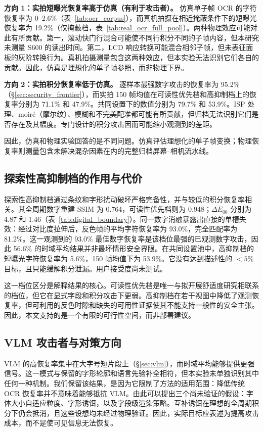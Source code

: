 \documentclass{ieeeaccess}
\begin{document}
\textbf{方向 1：实拍短曝光恢复率高于仿真（有利于攻击者）。} 仿真单子帧 OCR 的字符恢复率为 0--2.6\%（表~\ref{tab:ocr_corpus}），而真机拍摄在相近掩蔽条件下的短曝光恢复率为 19.2\%（仅掩蔽档，表~\ref{tab:real_ocr_full_pool}）。两种物理效应可能对此有所贡献。第一，滚动快门行混合可能使不同行积分不同的子帧内容，但本研究未测量 S600 的读出时间。第二，LCD 响应转换可能混合相邻子帧，但未表征面板的灰阶转换行为。真机拍摄测量包含这两种效应，但本实验无法识别它们各自的贡献。因此，仿真是理想化的单子帧参照，而非物理下界。

\textbf{方向 2：实拍积分恢复率低于仿真。} 逐样本最强数字攻击的恢复率为 95.2\%（\S\ref{sec:security_frontier}），而实拍 150 帧均值在可读性优先档和高抑制档上的恢复率分别为 71.1\% 和 47.9\%。共同设置下的数值分别为 79.7\% 和 53.9\%。ISP 处理、moir\'{e}（摩尔纹）、模糊和不完美配准都可能有所贡献，但归档无法识别它们是否存在及其幅度。专门设计的积分攻击因而可能缩小观测到的差距。

因此，仿真和物理实验回答的是不同问题。仿真评估理想化的单子帧变换；物理恢复率则测量包含未解决混杂因素在内的完整归档屏幕--相机流水线。

\subsection{探索性高抑制档的作用与代价}

探索性高抑制档通过条纹和字形扰动破坏严格完备性，并与较低的积分恢复率相关。其全周期数字重建 SSIM 为 0.764，可读性优先档则为 0.948；$\Delta E_{00}$ 分别为 4.87 和 1.46（表~\ref{tab:digital_boundary}）。同一数字消融暴露出直接的单槽失效：经过对比度拉伸后，反色帧的平均字符恢复率为 93.0\%，完全匹配率为 81.2\%。这一观测到的 93.0\% 最佳数字恢复率是该档位最强的已观测数字攻击，因此 56.6\% 的时域平均结果并非最坏情形安全界限。在共同设置池中，高抑制档的短曝光字符恢复率为 5.6\%，150 帧均值下为 53.9\%。它没有达到描述性的 $<5\%$ 目标，且只能缓解积分泄漏。用户接受度尚未测试。

这一档位区分是解释结果的核心。可读性优先档是唯一与拟开展舒适度研究相联系的档位，但它在显式字段和积分攻击下更弱。高抑制档在若干视图中降低了观测恢复率，但可利用的反色时隙和缺失的可用性证据使其不能支持一般性的安全主张。因此，本文支持的是一个有限的可行性空间，而非部署建议。

\subsection{VLM 攻击者与对策方向}
\label{sec:vlm_defense}

VLM 的高恢复率集中在大字号短片段上（\S\ref{sec:vlm}），而时域平均能够提供更强信号。这一模式与保留的字形轮廓和语言先验补全相符，但本实验未单独识别其中任何一种机制。我们保留该结果，是因为它限制了方法的适用范围：降低传统 OCR 恢复率并不意味着能够抵抗 VLM。由此可以提出三个尚未验证的假设：字体大小自适应粒度、字形诱饵，以及字段级渲染策略。互补诱饵在理想的全周期积分下仍会抵消，且这些设想均未经过物理验证。因此，实际目标应表述为提高攻击成本，而不是使可见信息无法恢复。
\end{document}
